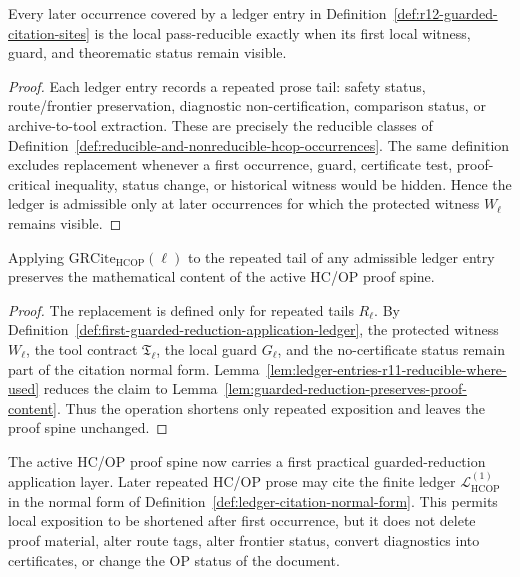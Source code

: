\begin{lemma}
\label{lem:ledger-entries-r11-reducible-where-used}
Every later occurrence covered by a ledger entry in Definition~\ref{def:r12-guarded-citation-sites} is the local pass-reducible exactly when its first local witness, guard, and theorematic status remain visible.
\end{lemma}

\begin{proof}
Each ledger entry records a repeated prose tail: safety status, route/frontier preservation, diagnostic non-certification, comparison status, or archive-to-tool extraction. These are precisely the reducible classes of Definition~\ref{def:reducible-and-nonreducible-hcop-occurrences}. The same definition excludes replacement whenever a first occurrence, guard, certificate test, proof-critical inequality, status change, or historical witness would be hidden. Hence the ledger is admissible only at later occurrences for which the protected witness \(W_{\ell}\) remains visible.
\end{proof}

\begin{proposition}
\label{prop:first-guarded-reduction-application-conservative}
Applying \(\mathrm{GRCite}_{\mathrm{HCOP}}(\ell)\) to the repeated tail of any admissible ledger entry preserves the mathematical content of the active HC/OP proof spine.
\end{proposition}

\begin{proof}
The replacement is defined only for repeated tails \(R_{\ell}\). By Definition~\ref{def:first-guarded-reduction-application-ledger}, the protected witness \(W_{\ell}\), the tool contract \(\mathfrak T_{\ell}\), the local guard \(G_{\ell}\), and the no-certificate status remain part of the citation normal form. Lemma~\ref{lem:ledger-entries-r11-reducible-where-used} reduces the claim to Lemma~\ref{lem:guarded-reduction-preserves-proof-content}. Thus the operation shortens only repeated exposition and leaves the proof spine unchanged.
\end{proof}

\begin{theorem}
\label{thm:first-guarded-reduction-application-theorem}
The active HC/OP proof spine now carries a first practical guarded-reduction application layer. Later repeated HC/OP prose may cite the finite ledger \(\mathcal L_{\mathrm{HCOP}}^{(1)}\) in the normal form of Definition~\ref{def:ledger-citation-normal-form}. This permits local exposition to be shortened after first occurrence, but it does not delete proof material, alter route tags, alter frontier status, convert diagnostics into certificates, or change the OP status of the document.
\end{theorem}

